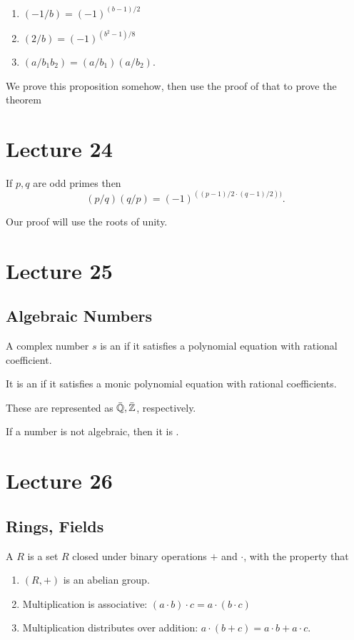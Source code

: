 \documentclass{article}
\begin{document}
\begin{proposition}
	\begin{enumerate}[label=(\roman*)] 
		\item $(-1 / b) = (-1)^{(b-1)/2}$ 
		\item $(2 / b) = (-1)^{(b^2 - 1)/8}$
		\item $(a / b_1b_2) = (a/b_1)(a/b_2)$.
	\end{enumerate}
\end{proposition}

We prove this proposition somehow, then use the proof of that to prove the theorem 

\section{Lecture 24}
\begin{theorem} 
	If $p, q$ are odd primes then \[(p/q)(q/p) = (-1)^{((p-1)/2 \cdot (q-1)/2))}.\]
\end{theorem}

Our proof will use the roots of unity. 

\section{Lecture 25} 
\subsection{Algebraic Numbers}
\begin{definition} 
	A complex number $s$ is an  if it satisfies a polynomial equation with rational coefficient. 

	It is an  if it satisfies a monic polynomial equation with rational coefficients.

	These are represented as $\bar{\mathbb Q}, \bar{\mathbb Z}$, respectively.
\end{definition}

If a number is not algebraic, then it is . 
\section{Lecture 26}
\subsection{Rings, Fields}
\begin{definition}[Ring] 
	A  $R$ is a set $R$ closed under binary operations $+$ and $\cdot$, with the property that 
	\begin{enumerate}
		\item $(R, +)$ is an abelian group. 
		\item Multiplication is associative: $(a \cdot b) \cdot c = a \cdot (b \cdot c)$ 
		\item Multiplication distributes over addition: $a \cdot (b + c) = a \cdot b + a \cdot c$.
	\end{enumerate}
\end{definition}
\end{document}
